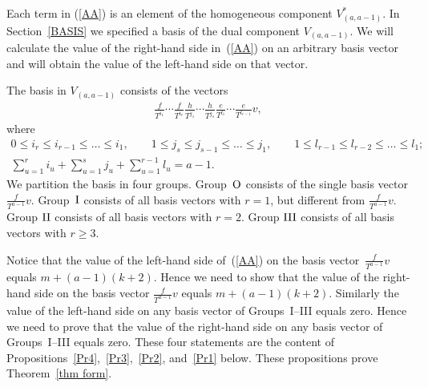 Each term in (\ref{AA}) is an element of the homogeneous component $V^*_{(a,a-1)}$. In Section~\ref{BASIS} we specified a basis of the dual component $V_{(a,a-1)}$. We will calculate the value of the right-hand side in~(\ref{AA}) on an arbitrary basis vector and will obtain the value of the left-hand side on that vector.

The basis in $V_{(a,a-1)}$ consists of the vectors
\begin{gather*}
\frac{f}{T^{i_1}}\cdots\frac{f}{T^{i_r}} \frac{h}{T^{j_1}}\cdots\frac{h}{T^{j_s}} \frac{e}{T^{l_1}}\cdots\frac{e}{T^{l_{r-1}}}v, %
\end{gather*}
where
\begin{gather*}
0\leq i_r\leq i_{r-1}\leq\dots\leq i_1, \qquad 1\leq j_s\leq j_{s-1}\leq\dots\leq j_1,\qquad 1\leq l_{r-1}\leq l_{r-2}\leq\dots\leq l_1;\nonumber\\
 \sum_{u=1}^r i_u + \sum_{u=1}^s j_u + \sum_{u=1}^{r-1} l_u = a-1. %
\end{gather*}
We partition the basis in four groups. Group~${\rm O}$ consists of the single basis vector $\frac{f}{T^{a-1}}v$. Group~${\rm I}$ consists of all basis vectors with $r=1$, but different from $\frac{f}{T^{a-1}}v$. Group ${\rm II}$ consists of all basis vectors with $r=2$. Group ${\rm III}$ consists of all basis vectors with $r\geq 3$.

Notice that the value of the left-hand side of~(\ref{AA}) on the basis vector~$\frac{f}{T^{a-1}}v$ equals $m + (a-1)(k+2)$. Hence we need to show that the value of the right-hand side on the basis vector $\frac{f}{T^{a-1}}v$ equals $m + (a-1)(k+2)$. Similarly the value of the left-hand side on any basis vector of Groups~\mbox{I--III} equals zero. Hence we need
to prove that the value of the right-hand side on any basis vector of Groups~I--III equals zero. These four statements are the content of Propositions~\ref{Pr4},~\ref{Pr3},~\ref{Pr2}, and~\ref{Pr1} below. These propositions prove Theorem~\ref{thm form}.

